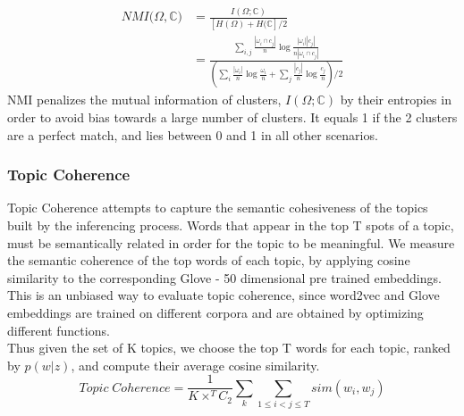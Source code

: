 \documentclass{sig-alternate-05-2015}
\begin{document}
\begin{align*}
NMI(\Omega, \mathbb{C)} &= \frac{I(\Omega ; \mathbb{C})}{\left[ H(\Omega) + H (\mathbb{C} \right] /2} \\[5pt]
&= \frac{ \sum_{i, j} \frac{| \omega_i \cap c_j|}{n} \log \frac{|\omega_i| |c_j|}
{n |\omega_i \cap c_j|} }{(\sum_i \frac{|\omega_i|}{n} \log \frac{\omega_i}{n} + \sum_j \frac{|c_j|}{n} \log \frac{c_j}{n})/2}
\end{align*}
NMI penalizes the mutual information of clusters, $I(\Omega ; \mathbb{C})$ by their entropies in order to avoid bias towards a large number of clusters. It equals 1 if the 2 clusters are a perfect match, and lies between 0 and 1 in all other scenarios.
\subsubsection{Topic Coherence}
Topic Coherence attempts to capture the semantic cohesiveness of the topics built by the inferencing process. Words that appear in the top T spots of a topic, must be semantically related in order for the topic to be meaningful. We measure the semantic coherence of the top words of each topic, by applying cosine similarity to the corresponding Glove - 50 dimensional pre trained embeddings. This is an unbiased way to evaluate topic coherence, since word2vec and Glove embeddings are trained on different corpora and are obtained by optimizing different functions.
\\
Thus given the set of K topics, we choose the top T words for each topic, ranked by $p(w|z)$, and compute their average cosine similarity.
$$Topic \;Coherence = \frac{1}{K \times ^{T}C_{2}}\sum_{k}\sum_{1 \leq i < j \leq T}sim(w_{i}, w_{j})$$
\end{document}
